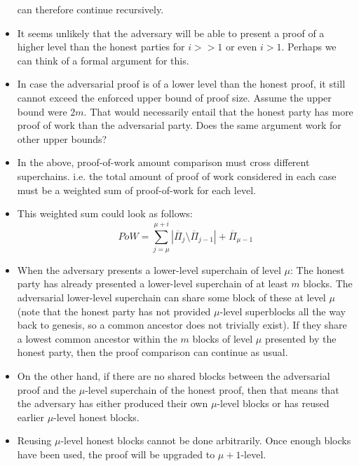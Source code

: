 \begin{itemize}
        can therefore continue recursively.
    \item
        It seems unlikely that the adversary will be able to present a proof of
        a higher level than the honest parties for $i >> 1$ or even $i > 1$.
        Perhaps we can think of a formal argument for this.
    \item
        In case the adversarial proof is of a lower level than the honest
        proof, it still cannot exceed the enforced upper bound of proof size.
        Assume the upper bound were $2m$. That would necessarily entail that
        the honest party has more proof of work than the adversarial party.
        Does the same argument work for other upper bounds?
    \item
        In the above, proof-of-work amount comparison must cross different
        superchains. i.e. the total amount of proof of work considered in each
        case must be a weighted sum of proof-of-work for each level.
    \item
        This weighted sum could look as follows:
        \begin{equation}
            PoW =
            \sum_{j = \mu}^{\mu + i}
            {|\overline{\Pi}_j \setminus \overline{\Pi}_{j - 1}|}
            + \overline{\Pi}_{\mu - 1}
        \end{equation}
    \item
        When the adversary presents a lower-level superchain of level $\mu$:
        The honest party has already presented a lower-level superchain of at
        least $m$ blocks. The adversarial lower-level superchain can share some
        block of these at level $\mu$ (note that the honest party has not
        provided $\mu$-level superblocks all the way back to genesis, so a
        common ancestor does not trivially exist). If they share a lowest
        common ancestor within the $m$ blocks of level $\mu$ presented by the
        honest party, then the proof comparison can continue as usual.
    \item
        On the other hand, if there are no shared blocks between the
        adversarial proof and the $\mu$-level superchain of the honest proof,
        then that means that the adversary has either produced their own
        $\mu$-level blocks or has reused earlier $\mu$-level honest blocks.
    \item
        Reusing $\mu$-level honest blocks cannot be done arbitrarily. Once
        enough blocks have been used, the proof will be upgraded to $\mu +
        1$-level.

\end{itemize}
